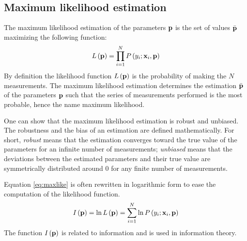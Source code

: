 \documentclass[twoside]{book}
\begin{document}
\subsection{Maximum likelihood estimation}
\label{sec:mlf} The maximum likelihood estimation of the
parameters ${\bf p}$ is the set of values $\bar{\bf p}$ maximizing
the following function:
\begin{equation}
\label{eq:maxlike}
  L\left({\bf p}\right)=\prod_{i=1}^N P\left(y_i;{\bf x}_i,{\bf p}\right)
\end{equation}
By definition the likelihood function $L\left({\bf p}\right)$ is
the probability of making the $N$ measurements. The maximum
likelihood estimation determines the estimation $\bar{\bf p}$ of
the parameters ${\bf p}$ such that the series of measurements
performed is the most probable, hence the name maximum likelihood.

One can show that the maximum likelihood estimation is robust and
unbiased. The robustness and the bias of an estimation are defined
mathematically. For short, {\sl robust} means that the estimation
converges toward the true value of the parameters for an infinite
number of measurements; {\sl unbiased} means that the deviations
between the estimated parameters and their true value are
symmetrically distributed around 0 for any finite number of
measurements.

Equation \ref{eq:maxlike} is often rewritten in logarithmic form
to ease the computation of the likelihood function.
\begin{equation}
\label{eq:logmaxlike}
  I\left({\bf p}\right)=\ln L\left({\bf p}\right)=\sum_{i=1}^N\ln P\left(y_i;{\bf x}_i,{\bf p}\right)
\end{equation}
The function $I\left({\bf p}\right)$ is related to information and
is used in information theory.
\end{document}
